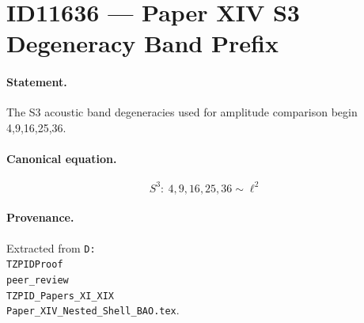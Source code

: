 \section*{ID11636 --- Paper XIV S3 Degeneracy Band Prefix}

\paragraph{Statement.}
The S3 acoustic band degeneracies used for amplitude comparison begin 4,9,16,25,36.

\paragraph{Canonical equation.}
\[
S^3:\ 4,9,16,25,36\sim\ell^2
\]

\paragraph{Provenance.}
Extracted from \texttt{D:\\TZPIDProof\\peer\_review\\TZPID\_Papers\_XI\_XIX\\Paper\_XIV\_Nested\_Shell\_BAO.tex}.
